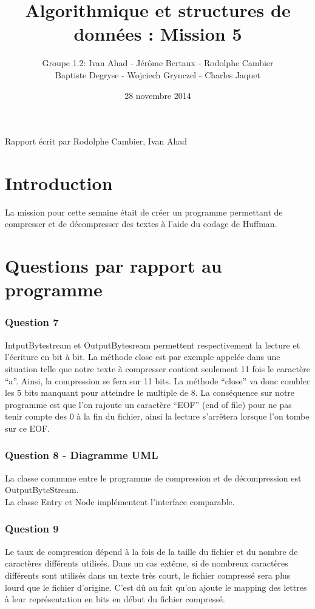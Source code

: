 \documentclass[a4paper]{article}
\title{Algorithmique et structures de données : Mission 5}
\date{28 novembre 2014}
\author{Groupe 1.2: Ivan Ahad - Jérôme Bertaux - Rodolphe Cambier \\ 
	Baptiste Degryse - Wojciech Grynczel - Charles Jaquet}
\begin{document}
\maketitle


Rapport écrit par Rodolphe Cambier, Ivan Ahad
\section*{Introduction}
La mission pour cette semaine était de créer un programme permettant de compresser et de décompresser des textes à l'aide du codage de Huffman. 

\section*{Questions par rapport au programme}

\subsubsection*{Question 7}

IntputBytestream et OutputBytesream permettent respectivement la lecture et l’écriture en bit à bit.
La méthode close est par exemple appelée dans une situation telle que notre texte à compresser contient seulement 11 fois le caractère “a”. Ainsi, la compression se fera sur 11 bits. La méthode “close” va donc combler les 5 bits manquant pour atteindre le multiple de 8. La conséquence sur notre programme est que l’on rajoute un caractère “EOF” (end of file) pour ne pas tenir compte des 0 à la fin du fichier, ainsi la lecture s’arrêtera lorsque l’on tombe sur ce EOF. 


\subsubsection*{Question 8 - Diagramme UML}

La classe commune entre le programme de compression et de décompression est OutputByteStream. 
\\
La classe Entry et Node implémentent l'interface comparable. 
\subsubsection*{Question 9}
Le taux de compression dépend à la fois de la taille du fichier et du nombre de caractères différents utilisés. Dans un cas extême, si de nombreux caractères différents sont utilisés dans un texte très court, le fichier compressé sera plus lourd que le fichier d'origine. C'est dû au fait qu'on ajoute le mapping des lettres à leur représentation en bits en début du fichier compressé.\\
\end{document}
